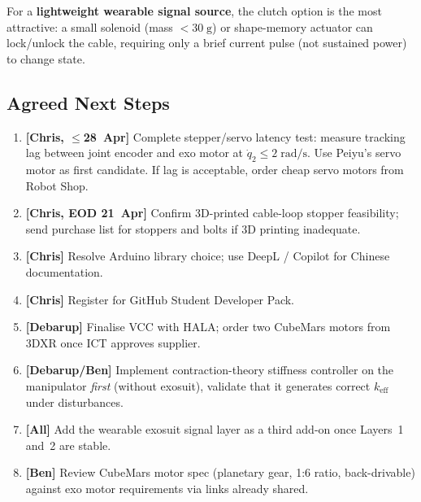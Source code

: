 \documentclass[11pt, a4paper]{article}
\begin{document}
\noindent
For a \textbf{lightweight wearable signal source}, the clutch option is the
most attractive: a small solenoid (mass $<30\;\text{g}$) or shape-memory
actuator can lock/unlock the cable, requiring only a brief current pulse
(not sustained power) to change state.

\subsection{Agreed Next Steps}

\begin{enumerate}
  \item \textbf{[Chris, \(\leq\)28~Apr]} Complete stepper/servo latency
    test: measure tracking lag between joint encoder and exo motor at
    $\dot{q}_2 \leq 2\;\text{rad/s}$.  Use Peiyu's servo motor as first
    candidate.  If lag is acceptable, order cheap servo motors from Robot
    Shop.
  \item \textbf{[Chris, EOD 21~Apr]} Confirm 3D-printed cable-loop stopper
    feasibility; send purchase list for stoppers and bolts if 3D printing
    inadequate.
  \item \textbf{[Chris]} Resolve Arduino library choice; use DeepL /
    Copilot for Chinese documentation.
  \item \textbf{[Chris]} Register for GitHub Student Developer Pack.
  \item \textbf{[Debarup]} Finalise VCC with HALA; order two CubeMars
    motors from 3DXR once ICT approves supplier.
  \item \textbf{[Debarup/Ben]} Implement contraction-theory stiffness
    controller on the manipulator \emph{first} (without exosuit), validate
    that it generates correct $k_{\text{eff}}$ under disturbances.
  \item \textbf{[All]} Add the wearable exosuit signal layer as a third
    add-on once Layers~1 and~2 are stable.
  \item \textbf{[Ben]} Review CubeMars motor spec (planetary gear, 1:6
    ratio, back-drivable) against exo motor requirements via links already
    shared.
\end{enumerate}
\end{document}
